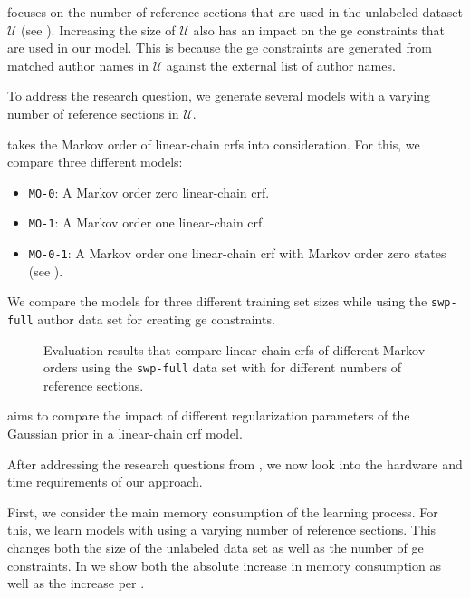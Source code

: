 \bigskip

 focuses on the number of reference sections that are used in the unlabeled dataset $\mathcal{U}$ (see ).
Increasing the size of $\mathcal{U}$ also has an impact on the \gls{ge} constraints that are used in our model.
This is because the \gls{ge} constraints are generated from matched author names in $\mathcal{U}$ against the external list of author names.

To address the research question, we generate several models with a varying number of reference sections in $\mathcal{U}$.

 takes the Markov order of \glspl{linear-chain crf} into consideration.
For this, we compare three different models:
\begin{itemize}
  \item \texttt{MO-0}: A Markov order zero \gls{linear-chain crf}.
  \item \texttt{MO-1}: A Markov order one \gls{linear-chain crf}.
  \item \texttt{MO-0-1}: A Markov order one \gls{linear-chain crf} with Markov order zero states (see ).
\end{itemize}
We compare the models for three different training set sizes while using the \texttt{swp-full} author data set for creating \gls{ge} constraints.

\begin{figure}[t]

\caption{Evaluation results that compare \glspl{linear-chain crf} of different Markov orders using the \texttt{swp-full} data set with for different numbers of reference sections.}
\label{fig:eval-markov-orders}
\end{figure}

\bigskip


 aims to compare the impact of different regularization parameters of the Gaussian prior in a \gls{linear-chain crf} model.

\bigskip

After addressing the research questions from , we now look into the hardware and time requirements of our approach.

First, we consider the main memory consumption of the learning process.
For this, we learn models with using a varying number of reference sections.
This changes both the size of the unlabeled data set as well as the number of \gls{ge} constraints.
In  we show both the absolute increase in memory consumption as well as the increase per .







